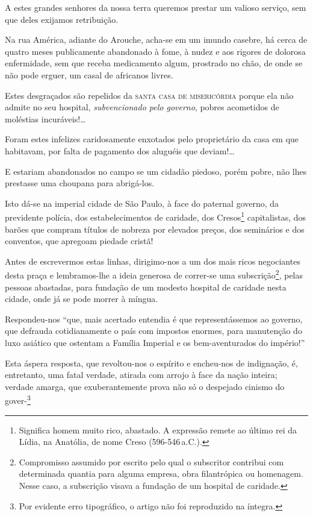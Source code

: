 A estes grandes senhores da nossa terra queremos prestar um valioso
serviço, sem que deles exijamos retribuição.

Na rua América, adiante do Arouche, acha-se em um imundo casebre, há
cerca de quatro meses publicamente abandonado à fome, à nudez e aos
rigores de dolorosa enfermidade, sem que receba medicamento algum,
prostrado no chão, de onde se não pode erguer, um casal de africanos
livres.

Estes desgraçados são repelidos da \textsc{santa casa de misericórdia} porque ela
não admite no seu hospital, \emph{subvencionado pelo governo}, pobres
acometidos de moléstias incuráveis!\ldots{}

Foram estes infelizes caridosamente enxotados pelo proprietário da casa
em que habitavam, por falta de pagamento dos aluguéis que
deviam!\ldots{}

E estariam abandonados no campo se um cidadão piedoso, porém pobre, não
lhes prestasse uma choupana para abrigá-los.

Isto dá-se na imperial cidade de São Paulo, à face do paternal governo,
da previdente polícia, dos estabelecimentos de caridade, dos
Cresos\footnote{Significa homem muito rico, abastado. A expressão
  remete ao último rei da Lídia, na Anatólia, de nome Creso (596-546\,a.C.).} 
  capitalistas, dos barões que compram títulos de nobreza por
elevados preços, dos seminários e dos conventos, que apregoam piedade
cristã!

Antes de escrevermos estas linhas, dirigimo-nos a um dos mais ricos
negociantes desta praça e lembramos-lhe a ideia generosa de correr-se
uma subscrição\footnote{Compromisso assumido por escrito pelo qual o
  subscritor contribui com determinada quantia para alguma empresa, obra
  filantrópica ou homenagem. Nesse caso, a subscrição visava a fundação
  de um hospital de caridade.}, pelas pessoas abastadas, para fundação
de um modesto hospital de caridade nesta cidade, onde já se pode morrer
à míngua.

Respondeu-nos ``que, mais acertado entendia é que representássemos ao
governo, que defrauda cotidianamente o país com impostos enormes, para
manutenção do luxo asiático que ostentam a Família Imperial e os
bem-aventurados do império!''

Esta áspera resposta, que revoltou-nos o espírito e encheu-nos de
indignação, é, entretanto, uma fatal verdade, atirada com arrojo à face
da nação inteira; verdade amarga, que exuberantemente prova não só o
despejado cinismo do gover-\footnote{Por evidente erro tipográfico, o
  artigo não foi reproduzido na íntegra.}

